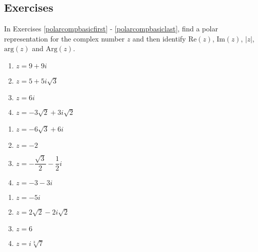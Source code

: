 \newpage

\subsection{Exercises}

In Exercises \ref{polarcompbasicfirst} - \ref{polarcompbasiclast}, find a polar representation for the complex number $z$ and then identify $\text{Re}(z)$, $\text{Im}(z)$, $|z|$, $\text{arg}(z)$ and $\text{Arg}(z)$.

\begin{multicols}{4}

\begin{enumerate}

\item $z = 9 + 9i$ \label{polarcompbasicfirst}
\item $z = 5 + 5i\sqrt{3}$
\item $z = 6i$
\item $z = -3\sqrt{2} + 3i\sqrt{2}$

\setcounter{HW}{\value{enumi}}

\end{enumerate}

\end{multicols}

\begin{multicols}{4} 

\begin{enumerate}

\setcounter{enumi}{\value{HW}}

\item $z = -6\sqrt{3} + 6i$ 
\item $z = -2$ 
\item $z = -\dfrac{\sqrt{3}}{2} - \dfrac{1}{2}i$
\item $z = -3-3i$ 

\setcounter{HW}{\value{enumi}}

\end{enumerate}

\end{multicols}

\begin{multicols}{4} 

\begin{enumerate}

\setcounter{enumi}{\value{HW}}

\item $z = -5i$
\item $z = 2\sqrt{2} - 2i\sqrt{2}$
\item $z = 6$
\item $z = i\sqrt[3]{7}$

\setcounter{HW}{\value{enumi}}

\end{enumerate}

\end{multicols}

